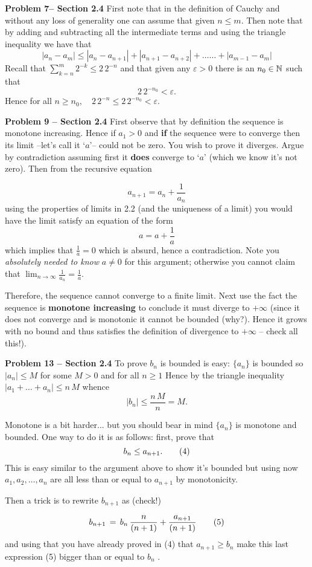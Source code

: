 \bigskip
 
{\bf Problem 7-- Section 2.4}  First note that in the definition of Cauchy and without any loss of generality one can assume that given $n  \leq  m$.
Then note that by adding and subtracting all the intermediate terms and using the triangle inequality we have that
$$ |a_n -a_m| \leq |a_n - a_{n+1}|  + |a_{n+1} - a_{n+2}|  + \dots \dots + |a_{m-1} - a_m| $$ 
Recall that $\sum_{k=n}^m 2^{-k} \leq 2 \, 2^{-n} $ and that given any $\varepsilon>0$ there is an $n_0 \in \Bbb N$ such that 
$$2 \, 2^{-n_0} < \varepsilon. $$ Hence  for all $n \ge n_0,\quad   2\,  2^{-n} \leq  2\, 2^{-n_0} < \varepsilon.$
 
 \bigskip
 
 {\bf Problem 9 -- Section 2.4}  First observe that by definition the sequence is monotone increasing. Hence if  $a_1>0$  and 
{\bf if} the sequence were to converge then its limit --let's call it `$a$'--  could not be zero. 
You wish to prove it diverges. Argue by contradiction assuming first it {\bf does} converge to  `$a$'
(which we know it's not zero). Then from the recursive equation 

$$ a_{n+1} = a_n  +  \frac{1}{a_n}    $$
using the properties of  limits in 2.2 (and the uniqueness of a limit) you would have the limit satisfy an equation of the form 
$$a = a +  \frac{1}{a} $$
which implies that  $\frac{1}{a}=0$ which is absurd, hence a contradiction.  Note you {\it absolutely needed to know} $a\neq 0$ for this argument; otherwise you cannot claim that $\lim_{n\to \infty} \frac{1}{a_n} = \frac{1}{a}$.

Therefore,  the sequence cannot converge to a finite limit.  Next use the fact the sequence is 
{\bf monotone increasing}  to conclude it must diverge to  $+\infty$  (since it does not converge and is monotonic it cannot be bounded (why?).  
Hence it grows with no bound and thus satisfies the definition of divergence to  $+\infty$ -- check all this!).  
 
\bigskip 
 
{\bf Problem 13 -- Section 2.4}  To prove $b_n$ is bounded is easy:  $\{a_n\}$  is bounded so  $|a_n| \leq  M$ for some $M>0$ and for all $n \geq 1$ 
Hence by the triangle inequality  $ |a_1+ \dots + a_n| \leq n\, M$  whence  $$|b_n|  \leq \frac{ n \, M}{n} =M. $$

Monotone is a bit harder... but you should bear in mind $\{a_n\}$  is monotone and bounded. 
One way to do it is as follows:  first, prove that   $$b_n  \leq  a_{n+1}.\tag 4$$ This is easy similar to the argument above to show it's bounded but using now $a_1, a_2, \dots, a_n$ are all less than or equal to $a_{n+1}$ by monotonicity.

Then a trick is to rewrite $b_{n+1}$ as  (check!)

$$b_{n+1}  \, =\,  b_n  \, \frac{n}{(n+1)}  + \frac{ a_{n+1} }{(n+1)} \tag5$$
and using that you have already proved in (4) that  $a_{n+1} \geq b_n$ make this last expression (5) bigger than or equal to $b_n$ .


\enddocument

